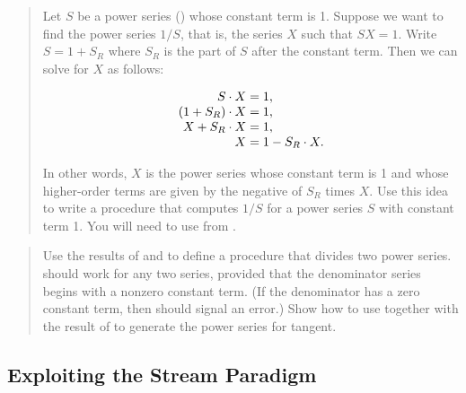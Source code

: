 \begin{quote}
 Let \( S \) be a power series
() whose constant term is 1.  Suppose we want to find the
power series \( 1 / S \), that is, the series \( X \) such that \( SX = 1 \).
Write \( S = 1 + S_R \) where \( S_R \) is the part of \( S \) after the
constant term.  Then we can solve for \( X \) as follows:
\begin{comment}

\begin{example}
        S * X = 1
(1 + S_R) * X = 1
  X + S_R * X = 1
            X = 1 - S_R * X
\end{example}

\end{comment}

$$
\begin{array}{r@{{}={}}l}
	        S \cdot X 	& 1, \\
	(1 + S_R) \cdot X 	& 1, \\
	  X + S_R \cdot X 	& 1, \\
	            	X 	& 1 - S_R \cdot X.
\end{array}
$$

In other words, \( X \) is the power series whose constant term is 1 and whose
higher-order terms are given by the negative of \( S_R \) times \( X \).  Use
this idea to write a procedure  that computes \( 1 / S \)
for a power series \( S \) with constant term 1.  You will need to use
 from .
\end{quote}

\begin{quote}
 Use the results of 
and  to define a procedure  that
divides two power series.   should work for any two series,
provided that the denominator series begins with a nonzero constant term.  (If
the denominator has a zero constant term, then  should signal
an error.)  Show how to use  together with the result of
 to generate the power series for tangent.
\end{quote}

\subsection{Exploiting the Stream Paradigm}
\label{Section 3.5.3}

